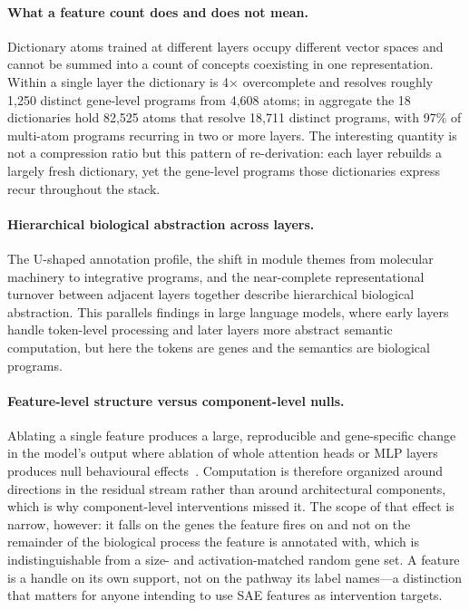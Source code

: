 \documentclass[onecolumn,11pt]{article}
\begin{document}
\paragraph{What a feature count does and does not mean.}
Dictionary atoms trained at different layers occupy different vector spaces and cannot be summed
into a count of concepts coexisting in one representation. Within a single layer the dictionary is
4$\times$ overcomplete and resolves roughly 1,250 distinct gene-level programs from 4,608 atoms; in
aggregate the 18 dictionaries hold 82,525 atoms that resolve 18,711 distinct programs, with 97\% of
multi-atom programs recurring in two or more layers. The interesting quantity is not a compression
ratio but this pattern of re-derivation: each layer rebuilds a largely fresh dictionary, yet the
gene-level programs those dictionaries express recur throughout the stack.

\paragraph{Hierarchical biological abstraction across layers.}
The U-shaped annotation profile, the shift in module themes from molecular machinery to integrative
programs, and the near-complete representational turnover between adjacent layers together describe
hierarchical biological abstraction. This parallels findings in large language models, where early
layers handle token-level processing and later layers more abstract semantic computation, but here
the tokens are genes and the semantics are biological programs.

\paragraph{Feature-level structure versus component-level nulls.}
Ablating a single feature produces a large, reproducible and gene-specific change in the model's
output where ablation of whole attention heads or MLP layers produces null behavioural
effects~\cite{kendiukhov2025systematic}. Computation is therefore organized around directions in
the residual stream rather than around architectural components, which is why component-level
interventions missed it. The scope of that effect is narrow, however: it falls on the genes the
feature fires on and not on the remainder of the biological process the feature is annotated with,
which is indistinguishable from a size- and activation-matched random gene set. A feature is a
handle on its own support, not on the pathway its label names---a distinction that matters for
anyone intending to use SAE features as intervention targets.
\end{document}
